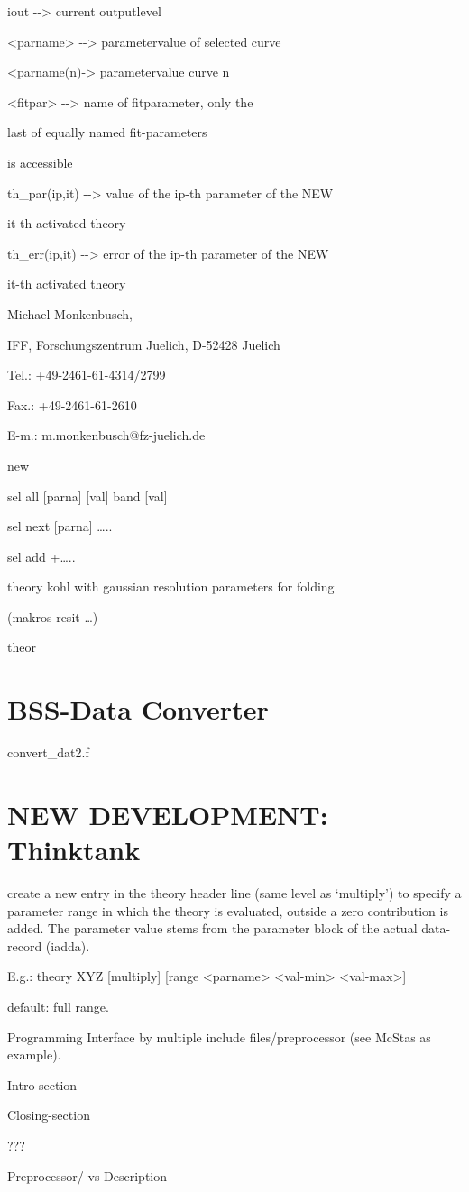 \documentclass[]{article}
\begin{document}
iout -\/-\textgreater{} current outputlevel

\textless{}parname\textgreater{} -\/-\textgreater{} parametervalue of
selected curve

\textless{}parname(n)-\textgreater{} parametervalue curve n

\textless{}fitpar\textgreater{} -\/-\textgreater{} name of fitparameter,
only the

last of equally named fit-parameters

is accessible

th\_par(ip,it) -\/-\textgreater{} value of the ip-th parameter of the
NEW

it-th activated theory

th\_err(ip,it) -\/-\textgreater{} error of the ip-th parameter of the
NEW

it-th activated theory

Michael Monkenbusch,

IFF, Forschungszentrum Juelich, D-52428 Juelich

Tel.: +49-2461-61-4314/2799

Fax.: +49-2461-61-2610

E-m.: m.monkenbusch@fz-juelich.de

new

sel all {[}parna{]} {[}val{]} band {[}val{]}

sel next {[}parna{]} \ldots{}..

sel add +\ldots{}..

theory kohl with gaussian resolution parameters for folding

(makros resit \ldots{})

theor

\hypertarget{bss-data-converter}{%
\section{BSS-Data Converter}\label{bss-data-converter}}

convert\_dat2.f

\hypertarget{new-development-thinktank}{%
\section{NEW DEVELOPMENT: Thinktank}\label{new-development-thinktank}}

create a new entry in the theory header line (same level as `multiply')
to specify a parameter range in which the theory is evaluated, outside a
zero contribution is added. The parameter value stems from the parameter
block of the actual data-record (iadda).

E.g.: theory XYZ {[}multiply{]} {[}range
\textless{}parname\textgreater{} \textless{}val-min\textgreater{}
\textless{}val-max\textgreater{}{]}

default: full range.

Programming Interface by multiple include files/preprocessor (see McStas
as example).

Intro-section

Closing-section

???

Preprocessor/ vs Description
\end{document}
